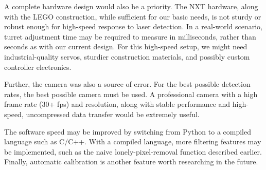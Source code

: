 \documentclass[10pt,twocolumn,letterpaper]{article}
\begin{document}
A complete hardware design would also be a priority.  The NXT hardware, along with the LEGO construction, while sufficient for our basic needs, is not sturdy or robust enough for high-speed response to laser detection.  In a real-world scenario, turret adjustment time may be required to measure in milliseconds, rather than seconds as with our current design.  For this high-speed setup, we might need industrial-quality servos, sturdier construction materials, and possibly custom controller electronics.

Further, the camera was also a source of error.  For the best possible detection rates, the best possible camera must be used.  A professional camera with a high frame rate (30+ fps) and resolution, along with stable performance and high-speed, uncompressed data transfer would be extremely useful.

The software speed may be improved by switching from Python to a compiled language such as C/C++.  With a compiled language, more filtering features may be implemented, such as the naive lonely-pixel-removal function described earlier.  Finally, automatic calibration is another feature worth researching in the future.

{\small


}
\end{document}
